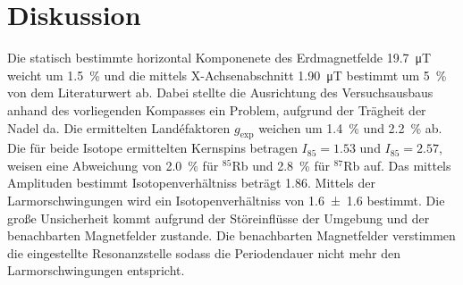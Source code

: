 \section{Diskussion}%
\label{sec:diskussion}
Die statisch bestimmte horizontal Komponenete des Erdmagnetfelde
\SI{19.7}{\micro\tesla} weicht um
\SI{1.5}{\percent} und die mittels X-Achsenabschnitt \SI{1.90}{\micro\tesla} bestimmt um
\SI{5}{\percent} von dem Literaturwert ab.
Dabei stellte die Ausrichtung des Versuchsausbaus anhand des vorliegenden
Kompasses ein Problem, aufgrund der Trägheit der Nadel da.
Die ermittelten Land\'efaktoren $g_\text{exp}$ weichen um \SI{1.4}{\percent}
und \SI{2.2}{\percent} ab.
Die für beide Isotope ermittelten Kernspins betragen $I_{85}=\num{1.53}$ und
$I_{85}=\num{2.57}$, weisen eine Abweichung von
\SI{2.0}{\percent} für $^{85}$Rb und \SI{2.8}{\percent} für 
$^{87}$Rb auf.
Das mittels Amplituden bestimmt Isotopenverhältniss beträgt \num{1.86}. 
Mittels der Larmorschwingungen wird ein Isotopenverhältniss von \num{1.6 +- 1.6}
bestimmt.
Die große Unsicherheit kommt aufgrund der Störeinflüsse der Umgebung und der
benachbarten Magnetfelder zustande.
Die benachbarten Magnetfelder verstimmen die eingestellte Resonanzstelle sodass die
Periodendauer nicht mehr den Larmorschwingungen entspricht. 
